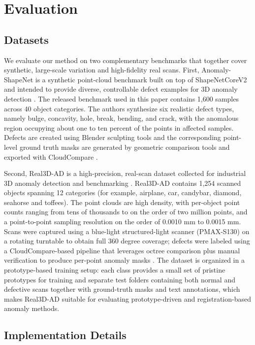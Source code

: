 \section{Evaluation}
\label{sec:Evaluation}

\subsection{Datasets}

We evaluate our method on two complementary benchmarks that together cover synthetic, large-scale variation and high-fidelity real scans.  First, Anomaly-ShapeNet is a synthetic point-cloud benchmark built on top of ShapeNetCoreV2 and intended to provide diverse, controllable defect examples for 3D anomaly detection \cite{li2024towards,chang2015shapenet}.  The released benchmark used in this paper contains 1,600 samples across 40 object categories. The authors synthesize six realistic defect types, namely bulge, concavity, hole, break, bending, and crack, with the anomalous region occupying about one to ten percent of the points in affected samples.  Defects are created using Blender sculpting tools and the corresponding point-level ground truth masks are generated by geometric comparison tools and exported with CloudCompare \cite{li2024towards}.

Second, Real3D-AD is a high-precision, real-scan dataset collected for industrial 3D anomaly detection and benchmarking \cite{liu2023real3d}. Real3D-AD contains 1,254 scanned objects spanning 12 categories (for example, airplane, car, candybar, diamond, seahorse and toffees).  The point clouds are high density, with per-object point counts ranging from tens of thousands to on the order of two million points, and a point-to-point sampling resolution on the order of 0.0010 mm to 0.0015 mm.  Scans were captured using a blue-light structured-light scanner (PMAX-S130) on a rotating turntable to obtain full 360 degree coverage; defects were labeled using a CloudCompare-based pipeline that leverages octree comparison plus manual verification to produce per-point anomaly masks \cite{liu2023real3d}.  The dataset is organized in a prototype-based training setup: each class provides a small set of pristine prototypes for training and separate test folders containing both normal and defective scans together with ground-truth masks and text annotations, which makes Real3D-AD suitable for evaluating prototype-driven and registration-based anomaly methods.

\subsection{Implementation Details}
\label{sec:impl}

